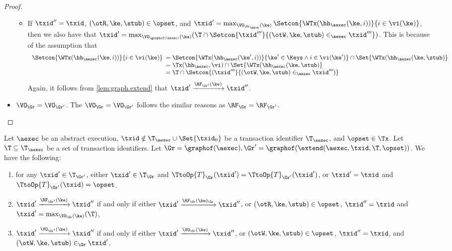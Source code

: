 \begin{proof}
\begin{itemize}
\begin{itemize}
\item If $\txid'' = \txid$, $(\otR, \ke, \stub) \in \opset$, and $\txid' = \max_{\VO_{\Gr_\mkvs}(\ke)} \Setcon{ \WTx(\hh_{\aexec}(\ke, i)) }{ i \in \vi(\ke)}$, 
    then we also have that $\txid' = \max_{\VO_{\graphof(\aexec)}(\ke)} (\T \cap \Setcon{ \txid''' }{ (\otW, \ke, \stub) \in_{\aexec} \txid'''}) $. 
This is because of the assumption that 
\[
\begin{array}{l}
    \Setcon{\WTx(\hh_{\aexec}(\ke, i)) }{ i \in \vi(\ke)}
    \begin{array}[t]{l}
    = \Setcon{\WTx(\hh_{\aexec}(\ke', i)) }{ \ke' \in \Keys \wedge i \in \vi(\ke')} \cap \Set{\WTx(\hh_{\aexec}(\ke, \stub)} \\
= \Tx(\hh_{\aexec}, \vi) \cap \Set{\WTx(\hh_{\aexec}(\ke, \stub)}  \\
= \T \cap \Setcon{(\txid''' }{ (\otW, \ke, \stub) \in_{\aexec} \txid''')}
\end{array}
\end{array}
\]
Again, it follows from \cref{lem:graph.extend} that $\txid' \xrightarrow{\RF_{\Gr'}(\ke)} \txid''$. 
\end{itemize}
\item \( \VO_{\Gr} = \VO_{\Gr'}\). The \( \VO_{\Gr} = \VO_{\Gr'} \) follows the similar reasons as $\RF_{\Gr} = \RF_{\Gr'}$.
\end{itemize}
\end{proof}

\begin{lemma}
\label{lem:graph.extend}
Let $\aexec$ be an abstract execution, 
$\txid \notin \T_{\aexec} \cup \Set{\txid_0}$ be a transaction identifier $\T_{\aexec}$, and $\opset \in \Tx$. 
Let $\T \subseteq \T_{\aexec}$ be a set of transaction identifiers.
Let $\Gr = \graphof(\aexec), \Gr' = \graphof(\extend(\aexec, \txid, \T, \opset))$. 
We have the following: 
\begin{enumerate}
\item for any $\txid' \in \T_{\Gr'}$, either $\txid' \in \T_{\Gr}$ and $\TtoOp{T}_{\Gr}(\txid') = \TtoOp{T}_{\Gr'}(\txid')$, 
or $\txid' = \txid$ and $\TtoOp{T}_{\Gr'}(\txid) = \opset$.
\item $\txid' \xrightarrow{\RF_{\Gr'}(\ke)} \txid''$ if and only if either 
$\txid' \xrightarrow{\RF_{\Gr}(\ke)_{\Gr}} \txid''$, or $(\otR, \ke, \stub) \in \opset$, $\txid'' = \txid$ and 
$\txid' = \max_{\VO_{\Gr}(\ke)}(\T)$, 
\item $\txid' \xrightarrow{\VO_{\Gr'}(\ke)} \txid''$ if and only if 
either $\txid' \xrightarrow{\VO_{\Gr}(\ke)} \txid''$, or $(\otW, \ke, \stub) \in \opset$, $\txid'' = \txid$, 
and $(\otW, \ke, \stub) \in_{\Gr} \txid'$.
\end{enumerate}
\end{lemma}

